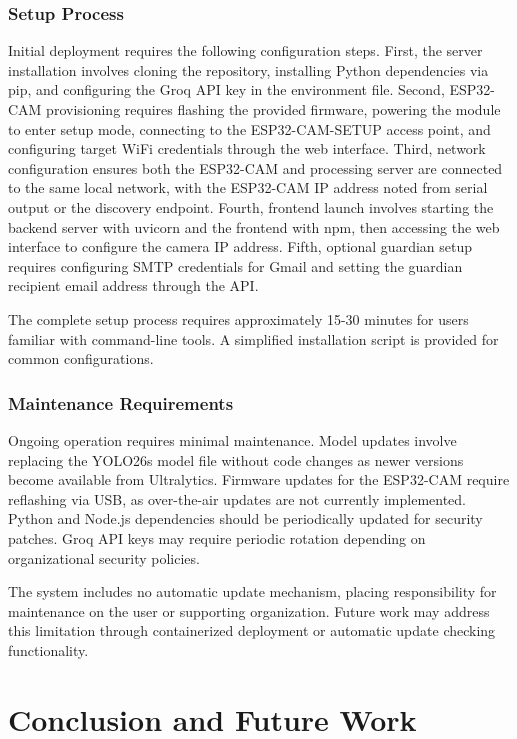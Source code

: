 \documentclass[12pt,a4paper]{report}
\begin{document}
\subsection{Setup Process}

Initial deployment requires the following configuration steps. First, the server installation involves cloning the repository, installing Python dependencies via pip, and configuring the Groq API key in the environment file. Second, ESP32-CAM provisioning requires flashing the provided firmware, powering the module to enter setup mode, connecting to the ESP32-CAM-SETUP access point, and configuring target WiFi credentials through the web interface. Third, network configuration ensures both the ESP32-CAM and processing server are connected to the same local network, with the ESP32-CAM IP address noted from serial output or the discovery endpoint. Fourth, frontend launch involves starting the backend server with uvicorn and the frontend with npm, then accessing the web interface to configure the camera IP address. Fifth, optional guardian setup requires configuring SMTP credentials for Gmail and setting the guardian recipient email address through the API.

The complete setup process requires approximately 15-30 minutes for users familiar with command-line tools. A simplified installation script is provided for common configurations.

\subsection{Maintenance Requirements}

Ongoing operation requires minimal maintenance. Model updates involve replacing the YOLO26s model file without code changes as newer versions become available from Ultralytics. Firmware updates for the ESP32-CAM require reflashing via USB, as over-the-air updates are not currently implemented. Python and Node.js dependencies should be periodically updated for security patches. Groq API keys may require periodic rotation depending on organizational security policies.

The system includes no automatic update mechanism, placing responsibility for maintenance on the user or supporting organization. Future work may address this limitation through containerized deployment or automatic update checking functionality.


\chapter{Conclusion and Future Work}
\end{document}
